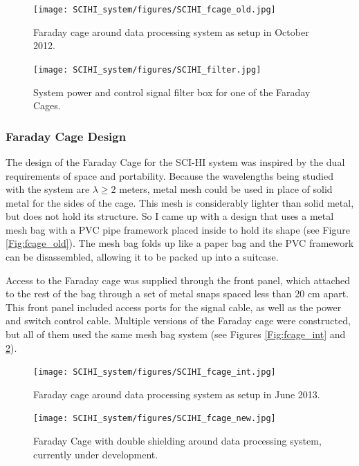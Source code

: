 \begin{figure}[htb]
\centering
\begin{minipage}[b]{0.36\textwidth}
\centering
\texttt{[image: SCIHI\_system/figures/SCIHI\_fcage\_old.jpg]}
\caption{Faraday cage around data processing system as setup in October 2012.}
\label{Fig:fcage_old}
\end{minipage}%
\begin{minipage}[b]{0.02\textwidth}
\hspace{1cm}
\end{minipage}%
\begin{minipage}[b]{0.58\textwidth}
\centering
\texttt{[image: SCIHI\_system/figures/SCIHI\_filter.jpg]}
\caption{System power and control signal filter box for one of the Faraday Cages.}
\label{Fig:fcage_filter}
\end{minipage}
\end{figure}

\subsubsection{Faraday Cage Design}
The design of the Faraday Cage for the SCI-HI system was inspired by the dual requirements of space and portability. Because the wavelengths being studied with the system are $\lambda \geq 2$ meters, metal mesh could be used in place of solid metal for the sides of the cage. This mesh is considerably lighter than solid metal, but does not hold its structure. So I came up with a design that uses a metal mesh bag with a PVC pipe framework placed inside to hold its shape (see Figure \ref{Fig:fcage_old}). The mesh bag folds up like a paper bag and the PVC framework can be disassembled, allowing it to be packed up into a suitcase. 

Access to the Faraday cage was supplied through the front panel, which attached to the rest of the bag through a set of metal snaps spaced less than 20 cm apart. This front panel included access ports for the signal cable, as well as the power and switch control cable. Multiple versions of the Faraday cage were constructed, but all of them used the same mesh bag system (see Figures \ref{Fig:fcage_int} and \ref{Fig:fcage_new}). 

\begin{figure}[htb]
\centering
\begin{minipage}[b]{0.44\textwidth}
\centering
\texttt{[image: SCIHI\_system/figures/SCIHI\_fcage\_int.jpg]}
\caption{Faraday cage around data processing system as setup in June 2013.}
\label{Fig:fcage_int}
\end{minipage}%
\begin{minipage}[b]{0.02\textwidth}
\hspace{1cm}
\end{minipage}%
\begin{minipage}[b]{0.50\textwidth}
\centering
\texttt{[image: SCIHI\_system/figures/SCIHI\_fcage\_new.jpg]}
\caption{Faraday Cage with double shielding around data processing system, currently under development.}
\label{Fig:fcage_new}
\end{minipage}
\end{figure}

